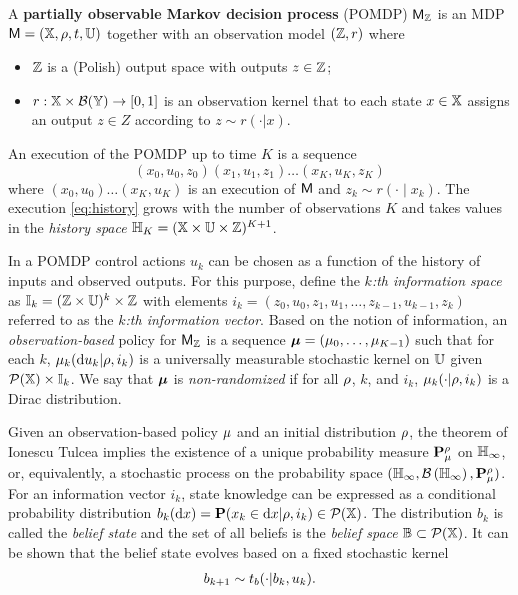 \documentclass{ifacconf}
\begin{document}
\begin{definition}
\label{def:POMDP}

A \textbf{partially observable Markov decision process} (POMDP) $\mathsf{M}_{{\mathbb{Z}}}$ is an MDP $\mathsf{M} = ({\mathbb{X}}, \rho, t, {\mathbb{U}})$ together with an observation model $({\mathbb{Z}}, r)$ where
\begin{itemize}
	\item ${\mathbb{Z}}$ is a (Polish) output space with outputs $z \in {\mathbb{Z}}$;
  \item $r : {\mathbb{X}} \times \mathcal B({\mathbb{Y}}) \rightarrow [0,1]$ is an observation kernel that to each state $x \in {\mathbb{X}}$ assigns an output $z \in Z$ according to $z\sim r(\cdot|x)$.
\end{itemize}
\end{definition} 

An execution of the POMDP up to time $K$ is a sequence
\begin{equation}
\label{eq:history} 
  (x_0,u_0,z_0) (x_1,u_1,z_1) \ldots (x_K,u_K,z_K)
\end{equation}
where $(x_0, u_0) \ldots (x_K, u_K)$ is an execution of $\mathsf{M}$ and $z_k \sim r(\cdot \mid x_k)$. The execution \eqref{eq:history} grows with the number of observations $K$ and takes values in the \emph{history space} ${\mathbb{H}}_K = ({\mathbb{X}} \times {\mathbb{U}} \times {\mathbb{Z}})^{K+1}$.

In a POMDP control actions $u_k$ can be chosen as a function of the history of inputs and observed outputs. For this purpose, define the \emph{$k$:th information space} as ${\mathbb{I}}_k = ({\mathbb{Z}} \times {\mathbb{U}})^{k} \times {\mathbb{Z}}$ with elements $i_k = (z_0,u_0,z_1,u_1,\ldots,z_{k-1}, u_{k-1}, z_k)$ referred to as the \emph{$k$:th information vector}. Based on the notion of information, an \emph{observation-based} policy for $\mathsf{M}_{{\mathbb{Z}}}$ is a sequence ${\boldsymbol{\mu}}=({\mu}_0,\ldots,{\mu}_{K-1})$ such that for each $k$, ${\mu}_k( \mathrm{d} u_k|\rho, i_k)$ is a universally measurable stochastic kernel on ${\mathbb{U}}$  given $\mathcal{P}({\mathbb{X}})\times {\mathbb{I}}_k$. We say that ${\boldsymbol{\mu}}$ is \emph{non-randomized} if for all $\rho$, $k$, and $i_k$, ${\mu}_k(\cdot|\rho, i_k)$ is a Dirac distribution. %

Given an observation-based policy ${\mu}$ and an initial distribution $\rho$, the theorem of Ionescu Tulcea \citep{hll1996} implies the existence of a unique probability measure $\mathbf{P}_{\mu}^\rho$ on ${\mathbb{H}}_\infty$, or, equivalently, a stochastic process on the probability space $({\mathbb{H}}_\infty, \mathcal{B}\left({\mathbb{H}}_\infty\right), \mathbf{P}_{\mu}^\rho)$. For an information vector $i_k$, state knowledge can be expressed as a conditional probability distribution $b_k( \mathrm{d} x )=\mathbf{P}(x_k\in \mathrm{d} x |\rho,i_k)\in \mathcal P ({\mathbb{X}})$. The distribution $b_k$ is called the \emph{belief state} and the set of all beliefs is the \emph{belief space} $\mathbb{B}\subset \mathcal P({\mathbb{X}})$. It can be shown that the belief state evolves based on a fixed stochastic kernel
\begin{align}
\label{eq:trb}
	 b_{k+1} \sim t_b(\cdot|b_k,u_k).
\end{align}
\end{document}
